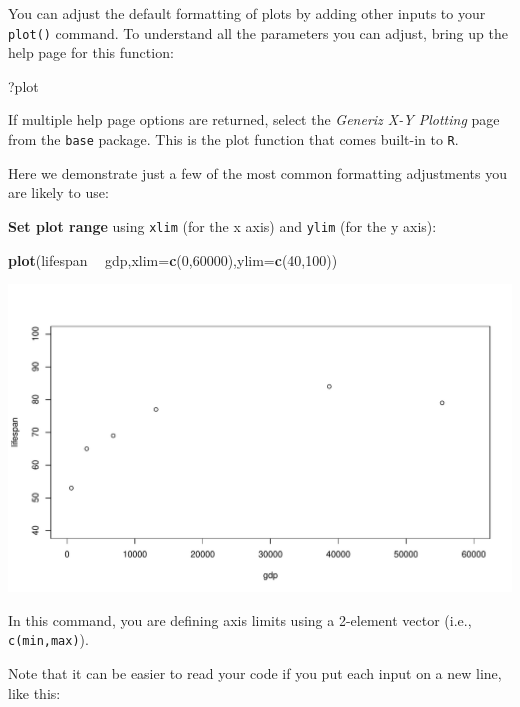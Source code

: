 \documentclass[
]{book}
\newenvironment{Shaded}{\begin{snugshade}}{\end{snugshade}}
\newcommand{\DataTypeTok}[1]{\textcolor[rgb]{0.13,0.29,0.53}{#1}}
\newcommand{\DecValTok}[1]{\textcolor[rgb]{0.00,0.00,0.81}{#1}}
\newcommand{\KeywordTok}[1]{\textcolor[rgb]{0.13,0.29,0.53}{\textbf{#1}}}
\newcommand{\NormalTok}[1]{#1}
\newcommand{\OperatorTok}[1]{\textcolor[rgb]{0.81,0.36,0.00}{\textbf{#1}}}
\newcommand{\StringTok}[1]{\textcolor[rgb]{0.31,0.60,0.02}{#1}}
\begin{document}
You can adjust the default formatting of plots by adding other inputs to your \texttt{plot()} command. To understand all the parameters you can adjust, bring up the help page for this function:

\begin{Shaded}
\begin{Highlighting}[]
\NormalTok{?plot}
\end{Highlighting}
\end{Shaded}

If multiple help page options are returned, select the \emph{Generiz X-Y Plotting} page from the \texttt{base} package. This is the plot function that comes built-in to \texttt{R}.

Here we demonstrate just a few of the most common formatting adjustments you are likely to use:

\textbf{Set plot range} using \texttt{xlim} (for the x axis) and \texttt{ylim} (for the y axis):

\begin{Shaded}
\begin{Highlighting}[]
\KeywordTok{plot}\NormalTok{(lifespan }\OperatorTok{~}\StringTok{ }\NormalTok{gdp,}\DataTypeTok{xlim=}\KeywordTok{c}\NormalTok{(}\DecValTok{0}\NormalTok{,}\DecValTok{60000}\NormalTok{),}\DataTypeTok{ylim=}\KeywordTok{c}\NormalTok{(}\DecValTok{40}\NormalTok{,}\DecValTok{100}\NormalTok{))}
\end{Highlighting}
\end{Shaded}

\includegraphics{figures/unnamed-chunk-104-1.pdf}

In this command, you are defining axis limits using a 2-element vector (i.e., \texttt{c(min,max)}).

Note that it can be easier to read your code if you put each input on a new line, like this:
\end{document}
